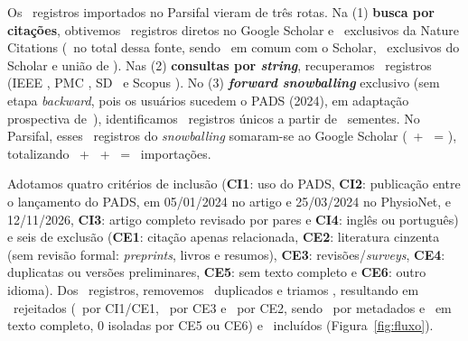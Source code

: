 Os \nImportados\ registros importados no Parsifal vieram de três rotas. Na (1)
\textbf{busca por citações}, obtivemos \nScholarDireto\ registros diretos no
Google Scholar e \nNatureExcl\ exclusivos da Nature Citations (\nNatureTotal\ no
total dessa fonte, sendo \nComumScholarNature\ em comum com o Scholar,
\nSoScholar\ exclusivos do Scholar e união de \nUniaoScholarNature). Nas (2)
\textbf{consultas por \textit{string}}, recuperamos \nStringsTotal\ registros
(IEEE \nStringsIEEE, PMC \nStringsPMC, SD \nStringsSD\ e Scopus \nStringsScopus).
No (3) \textbf{\textit{forward snowballing}} exclusivo (sem etapa
\textit{backward}, pois os usuários sucedem o PADS (2024), em adaptação
prospectiva de~\cite{fernandes_interoperability_2018}),
identificamos \nSnowballing\ registros únicos a partir de \nSementesSnowballing\
sementes. No Parsifal, esses \nSnowballing\ registros do \textit{snowballing}
somaram-se ao Google Scholar (\nScholarDireto\ + \nSnowballing\ =
\nScholarBalde), totalizando \nScholarBalde\ + \nNatureExcl\ + \nStringsTotal\ =
\nImportados\ importações.

Adotamos quatro critérios de inclusão (\textbf{CI1}: uso do PADS, \textbf{CI2}:
publicação entre o lançamento do PADS, em 05/01/2024 no artigo e 25/03/2024 no
PhysioNet, e 12/11/2026, \textbf{CI3}: artigo completo revisado por pares e
\textbf{CI4}: inglês ou português) e seis de exclusão (\textbf{CE1}: citação
apenas relacionada, \textbf{CE2}: literatura cinzenta (sem revisão formal: \textit{preprints}, livros e resumos), \textbf{CE3}:
revisões/\textit{surveys}, \textbf{CE4}: duplicatas ou versões preliminares, \textbf{CE5}: sem texto completo e \textbf{CE6}: outro
idioma). Dos \nImportados\ registros, removemos \nDuplicados\ duplicados e
triamos \nTriados, resultando em \nRejeitados\ rejeitados (\nRejCEUm\ por
CI1/CE1, \nRejCETres\ por CE3 e \nRejCEDois\ por CE2, sendo \nRejMetadados\ por
metadados e \nRejTexto\ em texto completo, 0 isoladas por CE5 ou CE6) e
\nAceitos\ incluídos (Figura~\ref{fig:fluxo}).

